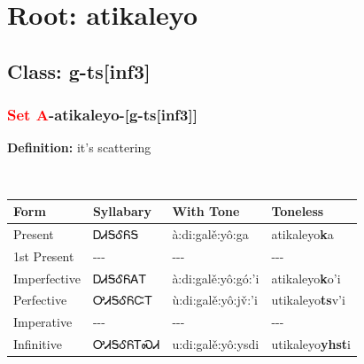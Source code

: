 \needspace{4in}
\section*{Root: atikaleyo}
\nopagebreak
{}
\needspace{3in}
\subsection*{Class: g-ts[inf3]}
\nopagebreak
\needspace{2in}
\subsubsection*{\textcolor{Red}{Set A}{-}\textbf{atikaleyo}{-}[g-ts[inf3]]}
\nopagebreak
\textbf{Definition: } it{\textquoteright}s scattering
\\[0.5em]
\begin{tabularx}{\textwidth}{l X X X}%
\toprule%
\textbf{Form}&\textbf{Syllabary}&\textbf{With Tone}&\textbf{Toneless}\\%
\midrule%
Present&ᎠᏗᎦᎴᏲᎦ&à:di:galě:yô:ga&atikaleyo\textbf{k}a\\%
1st Present&{-}{-}{-}&{-}{-}{-}&{-}{-}{-}\\%
Imperfective&ᎠᏗᎦᎴᏲᎪᎢ&à:di:galě:yô:gó:’i&atikaleyo\textbf{k}o'i\\%
Perfective&ᎤᏗᎦᎴᏲᏨᎢ&ù:di:galě:yô:jv̌:’i&utikaleyo\textbf{ts}v'i\\%
Imperative&{-}{-}{-}&{-}{-}{-}&{-}{-}{-}\\%
Infinitive&ᎤᏗᎦᎴᏲᎢᏍᏗ&u:di:galě:yô:ysdi&utikaleyo\textbf{yhst}i\\%
\bottomrule%
\end{tabularx}
\\[1em]